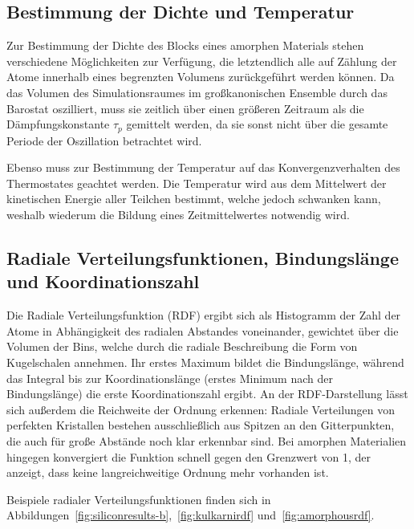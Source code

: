 \subsection{Bestimmung der Dichte und Temperatur}


Zur Bestimmung der Dichte des Blocks eines amorphen Materials stehen verschiedene Möglichkeiten zur Verfügung, die letztendlich alle auf Zählung der Atome innerhalb eines begrenzten Volumens zurückgeführt werden können.
Da das Volumen des Simulationsraumes im großkanonischen Ensemble durch das Barostat oszilliert, muss sie zeitlich über einen größeren Zeitraum als die Dämpfungskonstante $\tau_p$ gemittelt werden, da sie sonst nicht über die gesamte Periode der Oszillation betrachtet wird.

Ebenso muss zur Bestimmung der Temperatur auf das Konvergenzverhalten des Thermostates geachtet werden.
Die Temperatur wird aus dem Mittelwert der kinetischen Energie aller Teilchen bestimmt, welche jedoch schwanken kann, weshalb wiederum die Bildung eines Zeitmittelwertes notwendig wird.

\subsection{Radiale Verteilungsfunktionen, Bindungslänge und Koordinationszahl}

Die Radiale Verteilungsfunktion (RDF) ergibt sich als Histogramm der Zahl der Atome in Abhängigkeit des radialen Abstandes voneinander, gewichtet über die Volumen der Bins, welche durch die radiale Beschreibung die Form von Kugelschalen annehmen.
Ihr erstes Maximum bildet die Bindungslänge, während das Integral bis zur Koordinationslänge (erstes Minimum nach der Bindungslänge) die erste Koordinationszahl ergibt.
An der RDF-Darstellung lässt sich außerdem die Reichweite der Ordnung erkennen:
Radiale Verteilungen von perfekten Kristallen bestehen ausschließlich aus Spitzen an den Gitterpunkten, die auch für große Abstände noch klar erkennbar sind.
Bei amorphen Materialien hingegen konvergiert die Funktion schnell gegen den Grenzwert von 1, der anzeigt, dass keine langreichweitige Ordnung mehr vorhanden ist.

Beispiele radialer Verteilungsfunktionen finden sich in Abbildungen~\ref{fig:siliconresults-b},~\ref{fig:kulkarnirdf} und~\ref{fig:amorphousrdf}.


